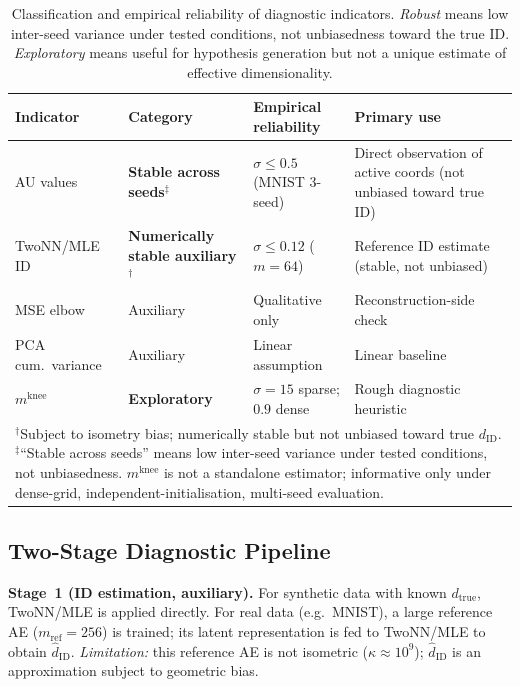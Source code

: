 \documentclass[11pt,a4paper]{article}
\newcommand{\dID}{d_{\mathrm{ID}}}
\newcommand{\dtrue}{d_{\mathrm{true}}}
\newcommand{\kap}{\kappa}
\newcommand{\mknee}{m^{\mathrm{knee}}}
\newcommand{\hatdID}{\hat{d}_{\mathrm{ID}}}
\begin{document}
\begin{table}[ht]
\centering
\caption{Classification and empirical reliability of diagnostic indicators.
\emph{Robust} means low inter-seed variance under tested conditions, not unbiasedness toward the true ID.
\emph{Exploratory} means useful for hypothesis generation but not a unique estimate of effective dimensionality.}
\label{tab:indicator_class}
\small
\begin{tabularx}{\linewidth}{lXXX}
\toprule
Indicator & Category & Empirical reliability & Primary use \\
\midrule
AU values & \textbf{Stable across seeds}$^\ddagger$ & $\sigma\!\leq\!0.5$ (MNIST 3-seed) & Direct observation of active coords (not unbiased toward true ID) \\
TwoNN/MLE ID & \textbf{Numerically stable auxiliary}$^\dagger$ & $\sigma\!\leq\!0.12$ ($m\!=\!64$) & Reference ID estimate (stable, not unbiased) \\
MSE elbow & Auxiliary & Qualitative only & Reconstruction-side check \\
PCA cum.\ variance & Auxiliary & Linear assumption & Linear baseline \\
$\mknee$ & \textbf{Exploratory} & $\sigma\!=\!15$ sparse; $0.9$ dense & Rough diagnostic heuristic \\
\bottomrule
\multicolumn{4}{p{0.97\linewidth}}{\footnotesize
$^\dagger$Subject to isometry bias; numerically stable but not unbiased toward true $\dID$.
$^\ddagger$``Stable across seeds'' means low inter-seed variance under tested conditions, not unbiasedness.
$\mknee$ is not a standalone estimator; informative only under dense-grid,
independent-initialisation, multi-seed evaluation.}
\end{tabularx}
\end{table}

\subsection{Two-Stage Diagnostic Pipeline}\label{sec:framework_pipeline}

\textbf{Stage~1 (ID estimation, auxiliary).}
For synthetic data with known $\dtrue$, TwoNN/MLE is applied directly.
For real data (e.g.\ MNIST), a large reference AE ($m_{\mathrm{ref}}=256$) is
trained; its latent representation is fed to TwoNN/MLE to obtain $\hatdID$.
\emph{Limitation:} this reference AE is not isometric ($\kap\approx10^9$);
$\hatdID$ is an approximation subject to geometric bias.
\end{document}
